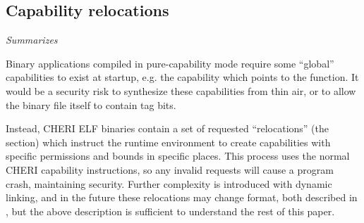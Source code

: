 \subsection{Capability relocations\label{chap:bg:subsec:cherirelocs}}
\emph{Summarizes \cite[Section 4.4, Appendix C]{TR-949}}

Binary applications compiled in pure-capability mode require some ``global'' capabilities to exist at startup, e.g. the capability which points to the  function.
It would be a security risk to synthesize these capabilities from thin air, or to allow the binary file itself to contain tag bits.

Instead, CHERI ELF binaries contain a set of requested ``relocations'' (the  section) which instruct the runtime environment to create capabilities with specific permissions and bounds in specific places.
This process uses the normal CHERI capability instructions, so any invalid requests will cause a program crash, maintaining security.
Further complexity is introduced with dynamic linking, and in the future these relocations may change format, both described in \cite{TR-949}, but the above description is sufficient to understand the rest of this paper.

